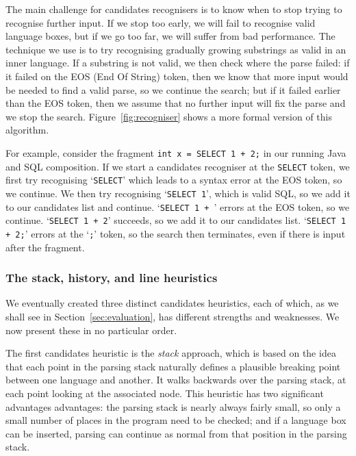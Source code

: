 \documentclass[sigplan,screen]{acmart}\settopmatter{printfolios=true,printccs=false,printacmref=false}
\begin{document}
The main challenge for candidates recognisers is to know when to stop trying to recognise
further input. If we stop too early, we will fail to recognise valid language
boxes, but if we go too far, we will suffer from bad performance. The technique
we use is to try recognising gradually growing substrings as valid in an inner
language. If a substring is not valid, we then check where the parse failed:
if it failed on the EOS (End Of String) token, then we know that more input
would be needed to find a valid parse, so we continue the search; but if it
failed earlier than the EOS token, then we assume that no further input will
fix the parse and we stop the search. Figure~\ref{fig:recogniser} shows a
more formal version of this algorithm.

For example, consider the fragment \texttt{int x = SELECT 1 + 2;} in our
running Java and SQL composition. If we start a candidates recogniser at the
\texttt{SELECT} token, we first try recognising `\texttt{SELECT}' which leads
to a syntax error at the EOS token, so we continue. We then try recognising
`\texttt{SELECT 1}', which is valid SQL, so we add it to our candidates list
and continue. `\texttt{SELECT 1 + }' errors at the EOS token, so we continue.
`\texttt{SELECT 1 + 2}' succeeds, so we add it to our candidates list.
`\texttt{SELECT 1 + 2;}' errors at the `\texttt{;}' token, so the search then
terminates, even if there is input after the fragment.


\subsubsection{The stack, history, and line heuristics}

We eventually created three distinct candidates heuristics, each of which, as
we shall see in Section~\ref{sec:evaluation}, has different strengths and
weaknesses. We now present these in no particular order.

The first candidates heuristic is the \emph{stack} approach, which is based on
the idea that each point in the parsing stack naturally defines a plausible
breaking point between one language and another. It walks backwards over the
parsing stack, at each point looking at the associated node. This heuristic has
two significant advantages
advantages: the parsing stack is nearly always fairly small, so only a small number
of places in the program need to be checked; and if a language box can be
inserted, parsing can continue as normal from that position in the parsing
stack.
\end{document}
